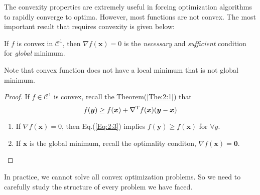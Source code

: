 The convexity properties are extremely useful in forcing optimization algorithms to rapidly converge to optima. However, most functions are not convex.  The most important result that requires convexity is given below:
\begin{theorem}
If $f$ is convex in $\mathcal{C}^1$, then $\nabla f(\bm x)=0$ is the \emph{necessary} and \emph{sufficient} condition for \emph{global} minimum.
\end{theorem}
Note that convex function does not have a local minimum that is not global minimum.
\begin{proof}
If $f\in\mathcal{C}^1$ is convex, recall the Theorem(\ref{The:2:1}) that
\begin{equation}
f(\bm y)\ge f(\bm x)+\nabla\trans f(\bm x)(\bm y-\bm x)\label{Eq:2:4}
\end{equation}
\begin{enumerate}
\item
If $\nabla f(\bm x)=0$, then Eq.(\ref{Eq:2:3}) implies $f(\bm y)\ge f(\bm x)$ for $\forall y$.
\item
If $\bm x$ is the global minimum, recall the optimality conditon, $\nabla f(\bm x)=\bm0$.
\end{enumerate}
\end{proof}

In practice, we cannot solve all convex optimization problems. So we need to carefully study the structure of every problem we have faced. 







